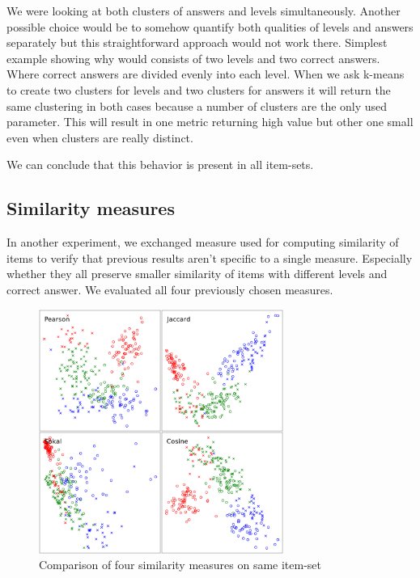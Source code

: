 \documentclass[
  digital, %
  table,   %
  nolof,     %
  nolot,     %
  nocover,
  color,
  final, %
]{fithesis3}
\begin{document}

We were looking at both clusters of answers and levels simultaneously. Another possible choice would be to somehow quantify both qualities of levels and answers separately but this straightforward approach would not work there. Simplest example showing why would consists of two levels and two correct answers. Where correct answers are divided evenly into each level. When we ask k-means to create two clusters for levels and two clusters for answers it will return the same clustering in both cases because a number of clusters are the only used parameter. This will result in one metric returning high value but other one small even when clusters are really distinct.


We can conclude that this behavior is present in all item-sets.


\subsection{Similarity measures}\label{evaluation-similarity-measures}

In another experiment, we exchanged measure used for computing similarity of items to verify that previous results aren't specific to a single measure. Especially whether they all preserve smaller similarity of items with different levels and correct answer. We evaluated all four previously chosen measures.

\begin{figure}
  \includegraphics[height=8cm]{img/measures}
  \caption{Comparison of four similarity measures on same item-set}
  \label{fig:measures}
\end{figure}
\end{document}
